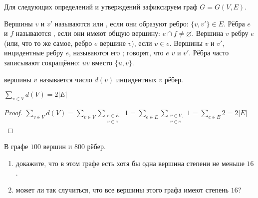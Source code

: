 Для следующих определений и утверждений зафиксируем граф $ G = G(V, E) $.
\begin{definition}
    Вершины $ v $ и $ v' $ называются  или , если они образуют ребро: $ \{v, v'\} \in E $.
    Рёбра $ e $ и $ f $ называются , если они имеют общую вершину: $ e \cap f \neq \varnothing $.
    Вершина $ v $  ребру $ e $ (или, что то же самое, ребро $ e $  вершине $ v $), если $ v \in e $.
    Вершины $ v $ и $ v' $, инцидентные ребру $ e $, называются его ;
    говорят, что $ e $  $ v $ и $ v' $.
    Рёбра часто записывают сокращённо: $ uv $ вместо $ \{u, v\} $.
\end{definition}

\begin{definition}
     вершины $ v $ называется число $ d(v) $ инцидентных $ v $ рёбер.
\end{definition}

\begin{theorem}[о рукопожатиях]
    \label{theorem:graphs:sum_of_degs}
    $ \displaystyle \sum_{v \in V} d(V) = 2 |E| $
\end{theorem}

\begin{proof}
    $ \displaystyle \sum_{v \in V} d(V) = \sum_{v \in V} \sum_{\substack{e \in E, \\ v \in e}} 1 = \sum_{e \in E} \sum_{\substack{v \in V, \\ v \in e}} 1 = \sum_{e \in E} 2 = 2 |E| $
\end{proof}

\begin{Exercise}[counter=SecExercise]
    \noindent
    В графе $ 100 $ вершин и $ 800 $ рёбер.
    \begin{enumerate}[label=\textbf{\alph*)}]
        \item
            докажите, что в этом графе есть хотя бы одна вершина степени не меньше $ 16 $.
        \item
            может ли так случиться, что все вершины этого графа имеют степень $ 16 $?
    \end{enumerate}
\end{Exercise}

